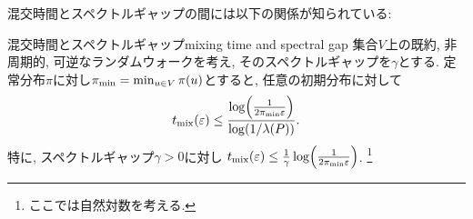 \begin{comment}
\begin{proof}
    \cref{thm:eigendecomposition}で得られる空間$\pispace$の正規直交基底$x_1,\dots,x_n$を考え,
    関数$f$をそれらの線形結合
    \[ f = \sum_{i=1}^n f_i x_i\]
    で表す (ここで$f_i = \piprod{f,x_i}$).
    ここで, $x_1 = \allone$なので$f_1 = \E_\pi f$なので,
    両辺に左から$P$を掛けて移項すると
    \[
        Pf - \Epi[f] \allone  = \sum_{i=2}^n f_i P x_i = \sum_{i=2}^n \lambda_i f_i x_i
    \]
    を得る.
    両辺の$\pinorm{\cdot}$をとると, ピタゴラスの定理より
    \begin{align*}
        \pinorm{Pf - \Epi[f]\allone}^2 & = \sum_{i=2}^n f_i^2 \lambda_i^2                  \\
                                       & \le \lambda(P)^2\cdot \sum_{i=2}^n f_i^2          \\
                                       & = \lambda(P)^2\cdot \pinorm{f - \Epi[f]\allone}^2 \\
                                       & = \lambda(P)^2\cdot \Varpi f
    \end{align*}
    を得る.
\end{proof}
\end{comment}
混交時間とスペクトルギャップの間には以下の関係が知られている:
\begin{lemma}{混交時間とスペクトルギャップ}{mixing time and spectral gap}
    集合$V$上の既約, 非周期的, 可逆なランダムウォークを考え,
    そのスペクトルギャップを$\gamma$とする.
    定常分布$\pi$に対し$\pi_{\min} = \min_{u\in V} \pi(u)$とすると,
    任意の初期分布に対して
    \[ \tmix(\varepsilon) \le\frac{\log\rbra*{\frac{1}{2\pimin\varepsilon}}}{\log(1/\lambda(P))}. \]
    特に, スペクトルギャップ$\gamma>0$に対し
    $\tmix(\varepsilon) \le \frac{1}{\gamma}\log\rbra*{\frac{1}{2\pimin\varepsilon}}$.
    \footnote{ここでは自然対数を考える.}
\end{lemma}
%
